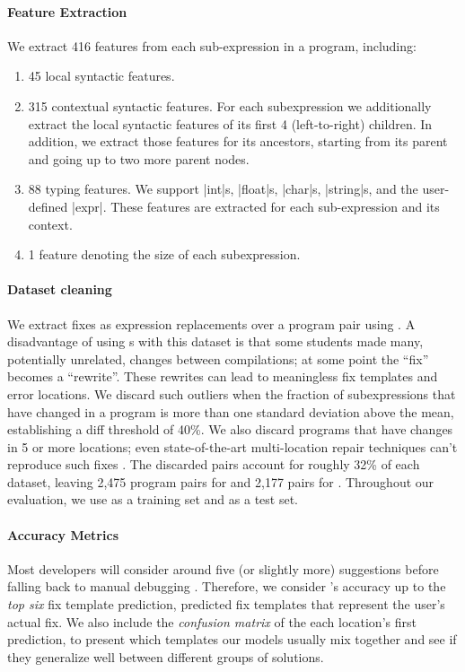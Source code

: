 \paragraph{Feature Extraction}
We extract 416 features from each sub-expression in a program, including:
%
\begin{enumerate}
  \item 45 local syntactic features.
  \item 315 contextual syntactic features. For each subexpression we
    additionally extract the local syntactic features of its first 4
    (left-to-right) children. In addition, we extract those features for its
    ancestors, starting from its parent and going up to two more parent nodes.
  \item 88 typing features. We support |int|s, |float|s, |char|s, |string|s, and
    the user-defined |expr|. These features are extracted for each
    sub-expression and its context.
  \item 1 feature denoting the size of each subexpression.
\end{enumerate}

\paragraph{Dataset cleaning}
We extract fixes as expression replacements over a program pair using \diffsym.
A disadvantage of using \diffsym s with this dataset is that some students
made many, potentially unrelated, changes between compilations; at some point
the ``fix'' becomes a ``rewrite''. These rewrites can lead to
meaningless fix templates and error locations. We discard such outliers when the
fraction of subexpressions that have changed in a program is more than one
standard deviation above the mean, establishing a diff threshold of 40\%. We
also discard programs that have changes in 5 or more locations; even
state-of-the-art multi-location repair techniques can't reproduce such fixes
\citep{Saha_2019}. The discarded pairs account for roughly 32\% of each
dataset, leaving 2,475 program pairs for \SPRING and 2,177 pairs for \FALL. Throughout
our evaluation, we use \SPRING as a training set and \FALL as a test set.

\paragraph{Accuracy Metrics}
Most developers will consider around five (or slightly more) suggestions before
falling back to manual debugging \citep{Kochhar2016-oc}. Therefore, we consider
\toolname's accuracy up to the \emph{top six} fix template prediction, \ie
predicted fix templates that represent the user's actual fix. We also include
the \emph{confusion matrix} of the each location's first prediction, to present
which templates our models usually mix together and see if they generalize well
between different groups of solutions.

